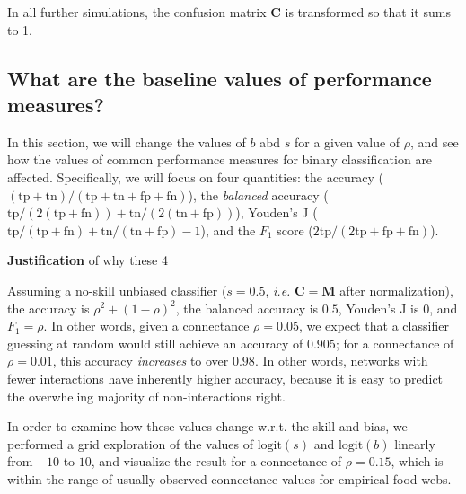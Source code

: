 \documentclass[11pt]{article}
\begin{document}
In all further simulations, the confusion matrix \(\mathbf{C}\) is
transformed so that it sums to 1.

\hypertarget{what-are-the-baseline-values-of-performance-measures}{%
\subsection{What are the baseline values of performance
measures?}\label{what-are-the-baseline-values-of-performance-measures}}

In this section, we will change the values of \(b\) abd \(s\) for a
given value of \(\rho\), and see how the values of common performance
measures for binary classification are affected. Specifically, we will
focus on four quantities: the accuracy
(\((\text{tp}+\text{tn})/(\text{tp}+\text{tn}+\text{fp}+\text{fn})\)),
the \emph{balanced} accuracy
(\(\text{tp}/(2(\text{tp}+\text{fn}))+\text{tn}/(2(\text{tn}+\text{fp}))\)),
Youden's J
(\(\text{tp}/(\text{tp}+\text{fn})+\text{tn}/(\text{tn}+\text{fp})-1\)),
and the \(F_1\) score (\(2\text{tp}/(2\text{tp}+\text{fp}+\text{fn})\)).

\textbf{Justification} of why these 4

Assuming a no-skill unbiased classifier (\(s=0.5\), \emph{i.e.}
\(\mathbf{C}=\mathbf{M}\) after normalization), the accuracy is
\(\rho^2 + (1-\rho)^2\), the balanced accuracy is \(0.5\), Youden's J is
\(0\), and \(F_1=\rho\). In other words, given a connectance
\(\rho = 0.05\), we expect that a classifier guessing at random would
still achieve an accuracy of \(0.905\); for a connectance of
\(\rho = 0.01\), this accuracy \emph{increases} to over \(0.98\). In
other words, networks with fewer interactions have inherently higher
accuracy, because it is easy to predict the overwheling majority of
non-interactions right.

In order to examine how these values change w.r.t. the skill and bias,
we performed a grid exploration of the values of \(\text{logit}(s)\) and
\(\text{logit}(b)\) linearly from \(-10\) to \(10\), and visualize the
result for a connectance of \(\rho = 0.15\), which is within the range
of usually observed connectance values for empirical food webs.
\end{document}
